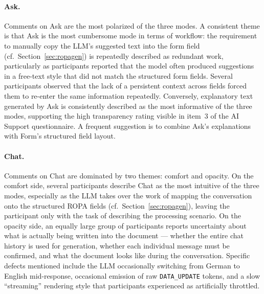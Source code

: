 \paragraph{Ask.} Comments on Ask are the most polarized of the
three modes. A consistent theme is that Ask is the most cumbersome
mode in terms of workflow: the requirement to manually copy the LLM's
suggested text into the form field (cf.\ Section~\ref{sec:ropagen}) is
repeatedly described as redundant work, particularly as
participants reported that the model often produced suggestions in a
free-text style that did not match the structured form fields.
Several participants observed that
the lack of a persistent context across fields forced them to
re-enter the same information repeatedly. Conversely, explanatory
text generated by Ask is consistently described as the most
informative of the three modes, supporting the high transparency
rating visible in item~3 of the AI Support questionnaire. A frequent
suggestion is to combine Ask's explanations with Form's structured
field layout.

\paragraph{Chat.} Comments on Chat are dominated by two themes:
comfort and opacity. On the comfort side, several participants
describe Chat as the most intuitive of the three modes, especially
as the LLM takes over the work of mapping the conversation onto
the structured ROPA fields (cf.\ Section~\ref{sec:ropagen}), leaving the
participant only with the task of describing the processing scenario. On the opacity side, an
equally large group of participants reports uncertainty about what is
actually being written into the document — whether the entire chat
history is used for generation, whether each individual message must
be confirmed, and what the document looks like during the
conversation. Specific defects mentioned include the LLM occasionally
switching from German to English mid-response, occasional emission of
raw \texttt{DATA\_UPDATE} tokens, and a slow ``streaming'' rendering
style that participants experienced as artificially throttled.

